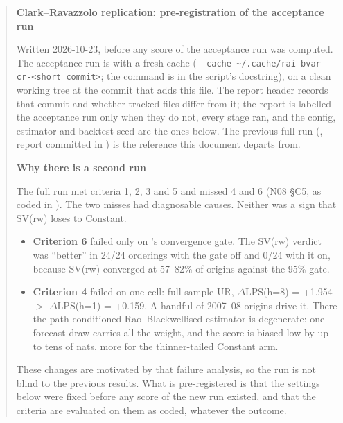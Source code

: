 \begin{quote}\footnotesize
\textbf{Clark--Ravazzolo replication: pre-registration of the acceptance run}

Written 2026-10-23, before any score of the acceptance run was computed. The acceptance run is
  
with a fresh cache (\texttt{-{}-cache \textasciitilde/.cache/rai-bvar-cr-\textless short
commit\textgreater}; the command is in the script's docstring), on a clean working tree at the commit
that adds this file. The report header records that commit and whether tracked files differ from it;
the report is labelled the acceptance run only when they do not, every stage ran, and the config,
estimator and backtest seed are the ones below. The previous full run (, report
 committed in ) is the reference this
document departs from.

\medskip\noindent\textbf{Why there is a second run}

The full run met criteria 1, 2, 3 and 5 and missed 4 and 6 (N08 \S C5, as coded in
). The two misses had diagnosable causes. Neither was a sign that
SV(rw) loses to Constant.
\begin{itemize}
\item \textbf{Criterion 6} failed only on 's convergence gate. The SV(rw) verdict was
``better'' in 24/24 orderings with the gate off and 0/24 with it on, because SV(rw) converged at
57--82\% of origins against the 95\% gate.
\item \textbf{Criterion 4} failed on one cell: full-sample UR, $\Delta$LPS(h=8) = +1.954 $>$
$\Delta$LPS(h=1) = +0.159. A handful of 2007--08 origins drive it. There the path-conditioned
Rao--Blackwellised estimator is degenerate: one forecast draw carries all the weight, and the score
is biased low by up to tens of nats, more for the thinner-tailed Constant arm.
\end{itemize}
These changes are motivated by that failure analysis, so the run is not blind to the previous
results. What is pre-registered is that the settings below were fixed before any score of the new
run existed, and that the criteria are evaluated on them as coded, whatever the outcome.


\end{quote}
